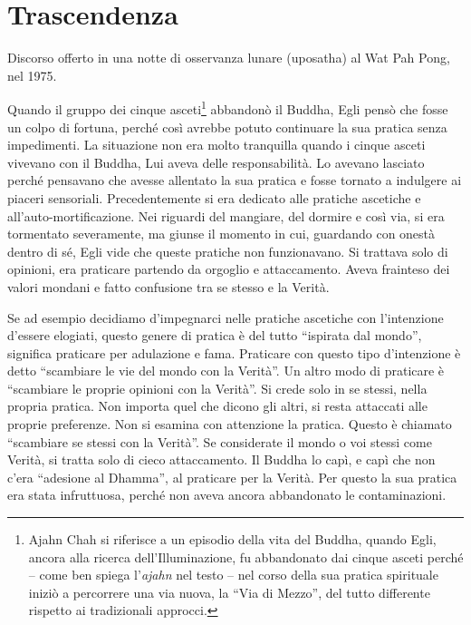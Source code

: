 \chapter{Trascendenza}

\begin{openingQuote}
  \centering

  Discorso offerto in una notte di osservanza lunare (uposatha) al Wat
  Pah Pong, nel 1975.
\end{openingQuote}

Quando il gruppo dei cinque asceti\footnote{Ajahn Chah si riferisce a un
  episodio della vita del Buddha, quando Egli, ancora alla ricerca
  dell'Illuminazione, fu abbandonato dai cinque asceti perché -- come
  ben spiega l'\emph{ajahn} nel testo -- nel corso della sua pratica
  spirituale iniziò a percorrere una via nuova, la ``Via di Mezzo'', del
  tutto differente rispetto ai tradizionali approcci.} abbandonò il
Buddha, Egli pensò che fosse un colpo di fortuna, perché così avrebbe
potuto continuare la sua pratica senza impedimenti. La situazione non
era molto tranquilla quando i cinque asceti vivevano con il Buddha, Lui
aveva delle responsabilità. Lo avevano lasciato perché pensavano che
avesse allentato la sua pratica e fosse tornato a indulgere ai piaceri
sensoriali. Precedentemente si era dedicato alle pratiche ascetiche e
all'auto-mortificazione. Nei riguardi del mangiare, del dormire e così
via, si era tormentato severamente, ma giunse il momento in cui,
guardando con onestà dentro di sé, Egli vide che queste pratiche non
funzionavano. Si trattava solo di opinioni, era praticare partendo da
orgoglio e attaccamento. Aveva frainteso dei valori mondani e fatto
confusione tra se stesso e la Verità.

Se ad esempio decidiamo d'impegnarci nelle pratiche ascetiche con
l'intenzione d'essere elogiati, questo genere di pratica è del tutto
``ispirata dal mondo'', significa praticare per adulazione e fama.
Praticare con questo tipo d'intenzione è detto ``scambiare le vie del
mondo con la Verità''. Un altro modo di praticare è ``scambiare le
proprie opinioni con la Verità''. Si crede solo in se stessi, nella
propria pratica. Non importa quel che dicono gli altri, si resta
attaccati alle proprie preferenze. Non si esamina con attenzione la
pratica. Questo è chiamato ``scambiare se stessi con la Verità''. Se
considerate il mondo o voi stessi come Verità, si tratta solo di cieco
attaccamento. Il Buddha lo capì, e capì che non c'era ``adesione al
Dhamma'', al praticare per la Verità. Per questo la sua pratica era
stata infruttuosa, perché non aveva ancora abbandonato le
contaminazioni.


